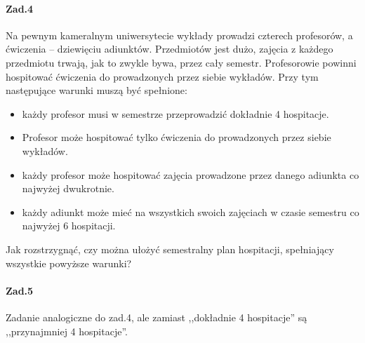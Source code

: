 \documentclass[a4paper,12pt]{article}
\theoremstyle{definition}%
\theoremstyle{definition}
\theoremstyle{problem}
\begin{document}
\paragraph{Zad.4} Na pewnym kameralnym uniwersytecie wykłady prowadzi czterech profesorów, a ćwiczenia – dziewięciu adiunktów. Przedmiotów jest dużo, zajęcia z każdego przedmiotu trwają, jak to zwykle bywa,
przez cały semestr. Profesorowie powinni hospitować ćwiczenia do prowadzonych przez siebie wykładów.
Przy tym następujące warunki muszą być spełnione:
\begin{itemize}
\item każdy profesor musi w semestrze przeprowadzić dokładnie 4 hospitacje.
\item Profesor może hospitować tylko ćwiczenia do prowadzonych przez siebie wykładów.
\item każdy profesor może hospitować zajęcia prowadzone przez danego adiunkta co najwyżej dwukrotnie.
\item każdy adiunkt może mieć na wszystkich swoich zajęciach w czasie semestru co najwyżej 6 hospitacji.
\end{itemize}
Jak rozstrzygnąć, czy można ułożyć semestralny plan hospitacji, spełniający wszystkie powyższe warunki?

\paragraph{Zad.5} Zadanie analogiczne do zad.4, ale zamiast ,,dokładnie 4 hospitacje” są  ,,przynajmniej 4 hospitacje”.
\end{document}

